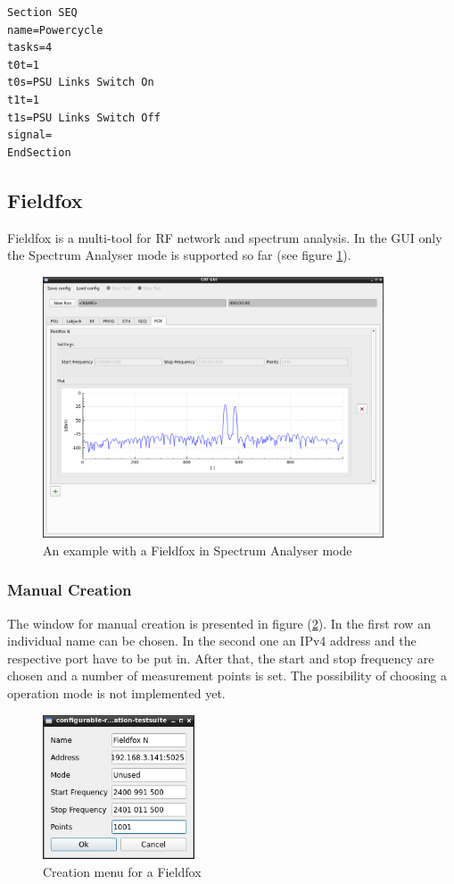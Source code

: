 \documentclass[10pt,a4paper]{article}
\begin{document}
\begin{lstlisting}[caption=SEQ Config]
Section SEQ
name=Powercycle
tasks=4
t0t=1
t0s=PSU Links Switch On
t1t=1
t1s=PSU Links Switch Off
signal=
EndSection
\end{lstlisting}

\newpage
	
	\subsection{Fieldfox}
	Fieldfox is a multi-tool for RF network and spectrum analysis. In the GUI only the Spectrum Analyser mode is supported so far (see figure \ref{f:fox_example}).
	
	\begin{figure}[H]
	\centering
	\includegraphics[width=0.9\textwidth]{./10_FOX_example.png}
	\caption{An example with a Fieldfox in Spectrum Analyser mode}
	\label{f:fox_example}
	\end{figure}
	
	\subsubsection{Manual Creation}	
	
	The window for manual creation is presented in figure (\ref{f:fox_menu}). In the first row an individual name can be chosen. In the second one an IPv4 address and the respective port have to be put in. After that, the start and stop frequency are chosen and a number of measurement points is set. The possibility of choosing a operation mode is not implemented yet.
	
	\begin{figure}[H]
	\centering
	\includegraphics[width=0.4\textwidth]{./10_FOX_menu.png}
	\caption{Creation menu for a Fieldfox}
	\label{f:fox_menu}
	\end{figure}
	
\end{document}
